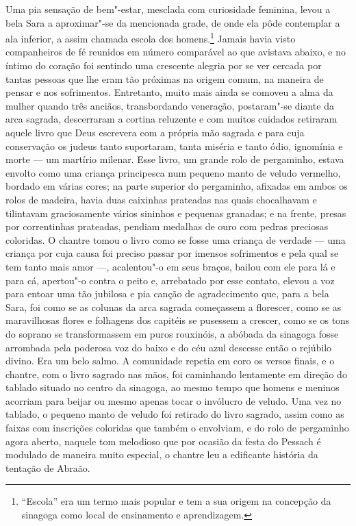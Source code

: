 Uma pia sensação de bem"-estar, mesclada com curiosidade feminina, levou
a bela Sara a aproximar"-se da mencionada grade, de onde ela pôde
contemplar a ala inferior, a assim chamada escola dos
homens.\footnote{ ``Escola''
era um termo mais popular e tem a sua origem na concepção da sinagoga
como local de ensinamento e aprendizagem.}
 Jamais havia visto companheiros de fé reunidos em número comparável ao
que avistava abaixo, e no íntimo do coração foi sentindo uma crescente
alegria por se ver cercada por tantas pessoas que lhe eram tão próximas
na origem comum, na maneira de pensar e nos sofrimentos. Entretanto,
muito mais ainda se comoveu a alma da mulher quando três anciãos,
transbordando veneração, postaram"-se diante da arca sagrada,
descerraram a cortina reluzente e com muitos cuidados retiraram aquele
livro que Deus escrevera com a própria mão sagrada e para cuja
conservação os judeus tanto suportaram, tanta miséria e tanto ódio,
ignomínia e morte --- um martírio milenar. Esse livro, um grande rolo de
pergaminho, estava envolto como uma criança principesca num pequeno
manto de veludo vermelho, bordado em várias cores; na parte superior do
pergaminho, afixadas em ambos os rolos de madeira, havia duas caixinhas
prateadas nas quais chocalhavam e tilintavam graciosamente vários
sininhos e pequenas granadas; e na frente, presas por correntinhas
prateadas, pendiam medalhas de ouro com pedras preciosas coloridas. O
chantre tomou o livro como se fosse uma criança de verdade --- uma
criança por cuja causa foi preciso passar por imensos sofrimentos e
pela qual se tem tanto mais amor ---, acalentou"-o em seus braços,
bailou com ele para lá e para cá, apertou"-o contra o peito e,
arrebatado por esse contato, elevou a voz para entoar uma tão jubilosa
e pia canção de agradecimento que, para a bela Sara, foi como se as
colunas da arca sagrada começassem a florescer, como se as maravilhosas
flores e folhagens dos capitéis se pusessem a crescer, como se os tons
do soprano se transformassem em puros rouxinóis, a abóbada da sinagoga
fosse arrombada pela poderosa voz do baixo e do céu azul descesse então
o rejúbilo divino. Era um belo salmo. A comunidade repetia em coro os
versos finais, e o chantre, com o livro sagrado nas mãos, foi
caminhando lentamente em direção do tablado situado no centro da
sinagoga, ao mesmo tempo que homens e meninos acorriam para beijar ou
mesmo apenas tocar o invólucro de veludo. Uma vez no tablado, o pequeno
manto de veludo foi retirado do livro sagrado, assim como as faixas com
inscrições coloridas que também o envolviam, e do rolo de pergaminho
agora aberto, naquele tom melodioso que por ocasião da festa do Pessach
é modulado de maneira muito especial, o chantre leu a edificante
história da tentação de Abraão.

